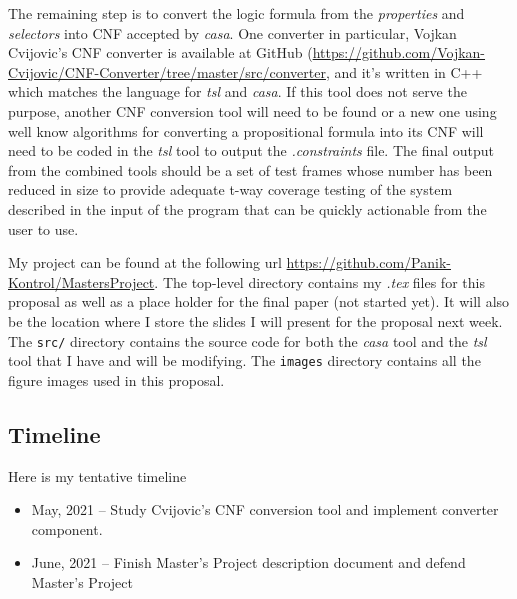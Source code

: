 \documentclass[a4full,12pt]{article}
\begin{document}
The remaining step is to convert the logic formula from the \emph{properties} and \emph{selectors}
  into CNF accepted by \emph{casa}. One converter in particular, Vojkan Cvijovic's CNF converter is
  available at GitHub (\url{https://github.com/Vojkan-Cvijovic/CNF-Converter/tree/master/src/converter},
  and it's written in C++ which matches the language for \emph{tsl} and
  \emph{casa}. If this tool does not serve the purpose, another CNF conversion tool will need to be
  found or a new one using well know algorithms for converting a propositional formula into its CNF
  will need to be coded in the \emph{tsl} tool to output the \emph{.constraints} file. The final
  output from the combined tools should be a set of test frames whose number has been reduced in size
  to provide adequate t-way coverage testing of the system described in the input of the program that
  can be quickly actionable from the user to use.
  
My project can be found at the following url \url{https://github.com/Panik-Kontrol/MastersProject}.
  The top-level directory contains my \emph{.tex} files for this proposal as well as a place
  holder for the final paper (not started yet). It will also be the location where I store the
  slides I will present for the proposal next week. The \texttt{src/} directory contains the source
  code for both the \emph{casa} tool and the \emph{tsl} tool that I have and will be modifying.
  The \texttt{images} directory contains all the figure images used in this proposal.
  
  \subsection{Timeline}
  Here is my tentative timeline
  \begin{itemize}
  \item May, 2021 -- Study Cvijovic's CNF conversion tool and implement converter component.
  \item June, 2021 -- Finish Master's Project description document and defend Master's Project
  \end{itemize}
\end{document}
